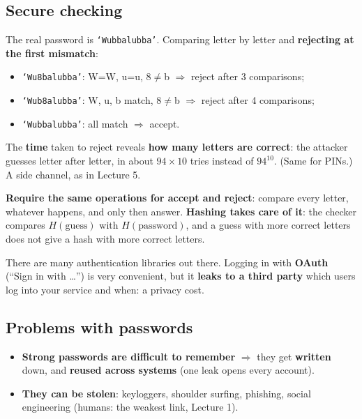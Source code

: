 \subsection{Secure checking}

\begin{warnbox}[title={Option 1: check letter by letter --- a timing channel}]
The real password is \texttt{`Wubbalubba'}. Comparing letter by letter and \textbf{rejecting at
the first mismatch}:
\begin{itemize}
  \item \texttt{`Wu8balubba'}: W=W, u=u, 8$\ne$b $\Rightarrow$ reject after 3 comparisons;
  \item \texttt{`Wub8alubba'}: W, u, b match, 8$\ne$b $\Rightarrow$ reject after 4 comparisons;
  \item \texttt{`Wubbalubba'}: all match $\Rightarrow$ accept.
\end{itemize}
The \textbf{time} taken to reject reveals \textbf{how many letters are correct}: the attacker
guesses letter after letter, in about $94 \times 10$ tries instead of $94^{10}$. (Same for PINs.)
A side channel, as in Lecture 5.
\end{warnbox}

\begin{propbox}[title={Option 2: always check everything}]
\textbf{Require the same operations for accept and reject}: compare every letter, whatever happens,
and only then answer. \textbf{Hashing takes care of it}: the checker compares $H(\text{guess})$ with
$H(\text{password})$, and a guess with more correct letters does not give a hash with more
correct letters.
\end{propbox}

\begin{rembox}[title={Do not program your own password checker}]
There are many authentication libraries out there. Logging in with \textbf{OAuth} (``Sign in
with \ldots'') is very convenient, but it \textbf{leaks to a third party} which users log into your
service and when: a privacy cost.
\end{rembox}

\subsection{Problems with passwords}

\begin{warnbox}[title=Problems with passwords]
\begin{itemize}
  \item \textbf{Strong passwords are difficult to remember} $\Rightarrow$ they get
        \textbf{written} down, and \textbf{reused across systems} (one leak opens every account).
  \item \textbf{They can be stolen}: keyloggers, shoulder surfing, phishing, social engineering
        (humans: the weakest link, Lecture 1).
\end{itemize}
\end{warnbox}

